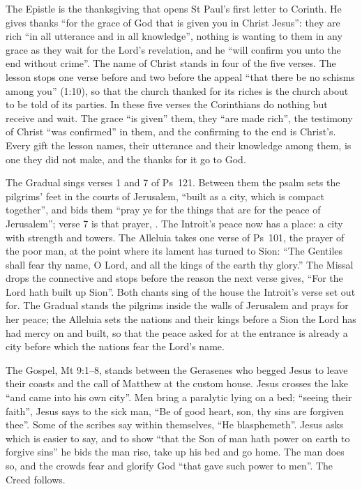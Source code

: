 The Epistle is the thanksgiving that opens St Paul's first letter to Corinth.
He gives thanks ``for the grace of God that is given you in Christ Jesus'':
they are rich ``in all utterance and in all knowledge'', nothing is wanting to
them in any grace as they wait for the Lord's revelation, and he ``will confirm
you unto the end without crime''. The name of Christ stands in four of the five
verses. The lesson stops one verse before  and two before
the appeal ``that there be no schisms among you'' (1:10), so that the church
thanked for its riches is the church about to be told of its parties. In these
five verses the Corinthians do nothing but receive and wait. The grace ``is
given'' them, they ``are made rich'', the testimony of Christ ``was confirmed''
in them, and the confirming to the end is Christ's. Every gift the lesson names, their utterance and their knowledge
among them, is one they did not make, and the thanks for it go to God.

The Gradual sings verses 1 and 7 of Ps~121. Between them the psalm sets the
pilgrims' feet in the courts of Jerusalem, ``built as a city, which is compact
together'', and bids them ``pray ye for the things that are for the peace of
Jerusalem''; verse 7 is that prayer, . The Introit's peace now has a place: a city with
strength and towers. The Alleluia takes one verse of Ps~101, the prayer of the
poor man, at the point where its lament has turned to Sion: ``The Gentiles shall
fear thy name, O Lord, and all the kings of the earth thy glory.'' The Missal
drops the connective  and stops before the reason the next verse
gives, ``For the Lord hath built up Sion''. Both chants sing of the house the
Introit's verse set out for. The Gradual stands the pilgrims inside the walls
of Jerusalem and prays for her peace; the Alleluia sets the nations and their
kings before a Sion the Lord has had mercy on and built, so that the peace
asked for at the entrance is already a city before which the nations fear the
Lord's name.

The Gospel, Mt 9:1--8, stands between the Gerasenes who begged Jesus to leave
their coasts and the call of Matthew at the custom house. Jesus crosses the
lake ``and came into his own city''. Men bring a paralytic lying on a bed;
``seeing their faith'', Jesus says to the sick man, ``Be of good heart, son,
thy sins are forgiven thee''. Some of the scribes say within themselves, ``He
blasphemeth''. Jesus asks which is easier to say, and to show ``that the Son of
man hath power on earth to forgive sins'' he bids the man rise, take up his bed
and go home. The man does so, and the crowds fear and glorify God ``that gave
such power to men''. The Creed follows.

